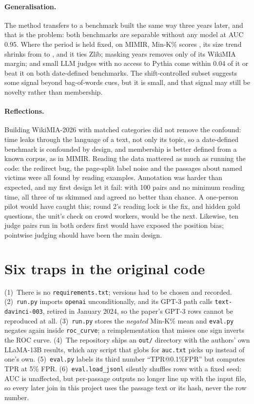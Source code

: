 \documentclass[11pt]{article}
\begin{document}
\paragraph{Generalisation.} The method transfers to a benchmark built the same way three years later, and that is the problem: both benchmarks are separable without any model at AUC 0.95. Where the period is held fixed, on MIMIR, Min-K\% scores \MimirMinK{}, its size trend shrinks from \RepSizeGain{} to \MimirSizeGain{}, and it ties Zlib; masking years removes only \MaskShareRange{} of its WikiMIA margin; and small LLM judges with no access to Pythia come within 0.04 of it or beat it on both date-defined benchmarks. The shift-controlled subset suggests some signal beyond bag-of-words cues, but it is small, and that signal may still be novelty rather than membership.

\paragraph{Reflections.} Building WikiMIA-2026 with matched categories did not remove the confound: time leaks through the language of a text, not only its topic, so a date-defined benchmark is confounded by design, and membership is better defined from a known corpus, as in MIMIR. Reading the data mattered as much as running the code: the redirect bug, the page-split label noise and the passages about named victims were all found by reading examples. Annotation was harder than expected, and my first design let it fail: with 100 pairs and no minimum reading time, all three of us skimmed and agreed no better than chance. A one-person pilot would have caught this; round 2's reading lock is the fix, and hidden gold questions, the unit's check on crowd workers, would be the next. Likewise, ten judge pairs run in both orders first would have exposed the position bias; pointwise judging should have been the main design.



\appendix

\section{Six traps in the original code}
\label{app:traps}

(1)~There is no \texttt{requirements.txt}; versions had to be chosen and recorded. (2)~\texttt{run.py} imports \texttt{openai} unconditionally, and its GPT-3 path calls \texttt{text-davinci-003}, retired in January 2024, so the paper's GPT-3 rows cannot be reproduced at all. (3)~\texttt{run.py} stores the \emph{negated} Min-K\% mean and \texttt{eval.py} negates again inside \texttt{roc\_curve}; a reimplementation that misses one sign inverts the ROC curve. (4)~The repository ships an \texttt{out/} directory with the authors' own LLaMA-13B results, which any script that globs for \texttt{auc.txt} picks up instead of one's own. (5)~\texttt{eval.py} labels its third number ``TPR@0.1\%FPR'' but computes TPR at 5\% FPR. (6)~\texttt{eval.load\_jsonl} silently shuffles rows with a fixed seed: AUC is unaffected, but per-passage outputs no longer line up with the input file, so every later join in this project uses the passage text or its hash, never the row number.
\end{document}

